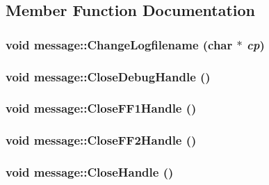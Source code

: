 \subsection{Member Function Documentation}
\hypertarget{classmessage_a5c0c99587c4270077b545d7b17823051}{
\subsubsection[{ChangeLogfilename}]{\setlength{\rightskip}{0pt plus 5cm}void message::ChangeLogfilename (char $\ast$ {\em cp})}}
\label{classmessage_a5c0c99587c4270077b545d7b17823051}
\hypertarget{classmessage_a5fa5bc2bad4c10edc4fa24527259a961}{
\subsubsection[{CloseDebugHandle}]{\setlength{\rightskip}{0pt plus 5cm}void message::CloseDebugHandle ()}}
\label{classmessage_a5fa5bc2bad4c10edc4fa24527259a961}
\hypertarget{classmessage_af45d625ae43381ebd81c13b0462fc7af}{
\subsubsection[{CloseFF1Handle}]{\setlength{\rightskip}{0pt plus 5cm}void message::CloseFF1Handle ()}}
\label{classmessage_af45d625ae43381ebd81c13b0462fc7af}
\hypertarget{classmessage_a19548e1e18c484e155ec7e91f6b647c6}{
\subsubsection[{CloseFF2Handle}]{\setlength{\rightskip}{0pt plus 5cm}void message::CloseFF2Handle ()}}
\label{classmessage_a19548e1e18c484e155ec7e91f6b647c6}
\hypertarget{classmessage_a8353517a95f66390d9e9add3276da11e}{
\subsubsection[{CloseHandle}]{\setlength{\rightskip}{0pt plus 5cm}void message::CloseHandle ()}}
